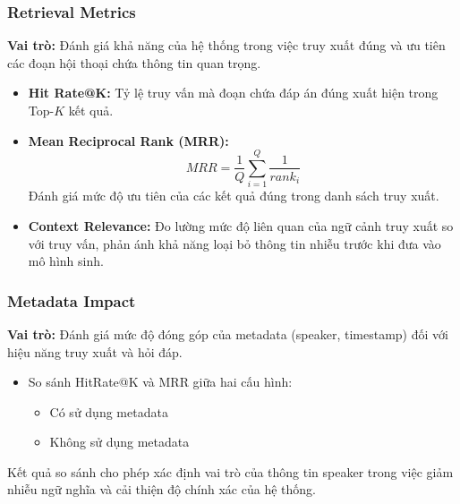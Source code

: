 \subsubsection{Retrieval Metrics}

\textbf{Vai trò:}
Đánh giá khả năng của hệ thống trong việc truy xuất đúng và ưu tiên các đoạn hội thoại chứa thông tin quan trọng.

\begin{itemize}
    \item \textbf{Hit Rate@K:} 
    Tỷ lệ truy vấn mà đoạn chứa đáp án đúng xuất hiện trong Top-$K$ kết quả.

    \item \textbf{Mean Reciprocal Rank (MRR):}
    \[
    MRR = \frac{1}{Q} \sum_{i=1}^{Q} \frac{1}{rank_i}
    \]
    Đánh giá mức độ ưu tiên của các kết quả đúng trong danh sách truy xuất.

    \item \textbf{Context Relevance:}
    Đo lường mức độ liên quan của ngữ cảnh truy xuất so với truy vấn, phản ánh khả năng loại bỏ thông tin nhiễu trước khi đưa vào mô hình sinh.
\end{itemize}

\subsubsection{Metadata Impact}

\textbf{Vai trò:}
Đánh giá mức độ đóng góp của metadata (speaker, timestamp) đối với hiệu năng truy xuất và hỏi đáp.

\begin{itemize}
    \item So sánh HitRate@K và MRR giữa hai cấu hình:
    \begin{itemize}
        \item Có sử dụng metadata
        \item Không sử dụng metadata
    \end{itemize}
\end{itemize}

Kết quả so sánh cho phép xác định vai trò của thông tin speaker trong việc giảm nhiễu ngữ nghĩa và cải thiện độ chính xác của hệ thống.